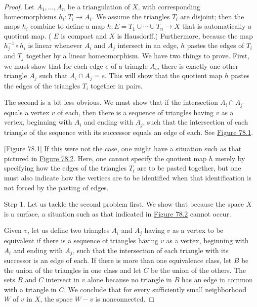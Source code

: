 \begin{proof}
	Let \(A_{1},\ldots ,A_{n}\) be a triangulation of \(X\), with corresponding homeomorphisms \(h_{i} : T_{i} \rightarrow {A}_{i}\). We assume the triangles \(T_{i}\) are disjoint; then the maps \(h_{i}\) combine to define a map \(h : E = T_{1} \cup \cdots \cup {T}_{n} \rightarrow X\) that is automatically a quotient map. ( \(E\) is compact and \(X\) is Hausdorff.) Furthermore, because the map \(h_j^{-1} \circ {h}_{i}\) is linear whenever \(A_{i}\) and \(A_{j}\) intersect in an edge, \(h\) pastes the edges of \(T_{i}\) and \(T_{j}\) together by a linear homeomorphism.
We have two things to prove. First, we must show that for each edge \(e\) of a triangle \(A_{i}\), there is exactly one other triangle \(A_{j}\) such that \(A_{i} \cap {A}_{j} = e\). This will show that the quotient map \(h\) pastes the edges of the triangles \(T_{i}\) together in pairs.

The second is a bit less obvious. We must show that if the intersection \(A_{i} \cap {A}_{j}\) equals a vertex \(v\) of each, then there is a sequence of triangles having \(v\) as a vertex, beginning with \(A_{i}\) and ending with \(A_{j}\), such that the intersection of each triangle of the sequence with its successor equals an edge of each. See \hyperref[fig:78.1]{Figure 78.1}.

[Figure 78.1]
If this were not the case, one might have a situation such as that pictured in \hyperref[fig:78.2]{Figure 78.2}. Here, one cannot specify the quotient map \(h\) merely by specifying how the edges of the triangles \(T_{i}\) are to be pasted together, but one must also indicate how the vertices are to be identified when that identification is not forced by the pasting of edges.

Step 1. Let us tackle the second problem first. We show that because the space \(X\) is a surface, a situation such as that indicated in \hyperref[fig:78.2]{Figure 78.2} cannot occur.

Given \(v\), let us define two triangles \(A_{i}\) and \(A_{j}\) having \(v\) as a vertex to be equivalent if there is a sequence of triangles having \(v\) as a vertex, beginning with \(A_{i}\) and ending with \(A_{j}\), such that the intersection of each triangle with its successor is an edge of each. If there is more than one equivalence class, let \(B\) be the union of the triangles in one class and let \(C\) be the union of the others. The sets \(B\) and \(C\) intersect in \(v\) alone because no triangle in \(B\) has an edge in common with a triangle in \(C\). We conclude that for every sufficiently small neighborhood \(W\) of \(v\) in \(X\), the space \(W - v\) is nonconnected.


\end{proof}
